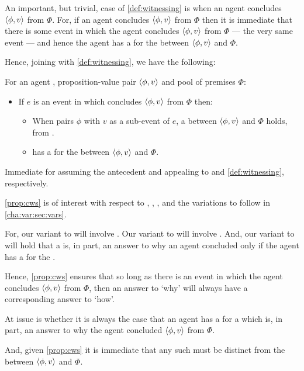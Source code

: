 \begin{note}
  An important, but trivial, case of \autoref{def:witnessing} is when an agent concludes \(\langle \phi, v \rangle\) from \(\Phi\).
  For, if an agent concludes \(\langle \phi, v \rangle\) from \(\Phi\) then it is immediate that there is some event in which the agent concludes \(\langle \phi, v \rangle\) from \(\Phi\) --- the very same event --- and hence the agent has a \wit{} for the \ros{} between \(\langle \phi, v \rangle\) and \(\Phi\).

  Hence, joining \supportI{} with \autoref{def:witnessing}, we have the following:

  \begin{proposition}
    \label{prop:cws}
    For an agent \vAgent{}, proposition-value pair \(\langle \phi, v \rangle\) and pool of premises \(\Phi\):
    \begin{itemize}
    \item
      If \(e\) is an event in which \vAgent{} concludes \(\langle \phi, v \rangle\) from \(\Phi\) then:
      \begin{itemize}
      \item
        When \vAgent{} pairs \(\phi\) with \(v\) as a sub-event of \(e\), a \ros{} between \(\langle \phi, v \rangle\) and \(\Phi\) holds, from .
      \item
        \vAgent{} has a \wit{} for the \ros{} between \(\langle \phi, v \rangle\) and \(\Phi\).
      \end{itemize}
    \end{itemize}
    \begin{argument}
      Immediate for assuming the antecedent and appealing to \supportI{} and \autoref{def:witnessing}, respectively.
    \end{argument}
  \end{proposition}

  \autoref{prop:cws} is of interest with respect to \qWhy{}, \qHow{}, \issueInclusion{}, and the variations to follow in \autoref{cha:var:sec:vars}.

  For, our variant to \qWhy{} will involve .
  Our variant to \qHow{} will involve .
  And, our variant to \issueInclusion{} will hold that a \ros{} is, in part, an answer to why an agent concluded only if the agent has a \wit{} for the \ros{}.

  Hence, \autoref{prop:cws} ensures that so long as there is an event in which the agent concludes \(\langle \phi, v \rangle\) from \(\Phi\), then an answer to `why' will always have a corresponding answer to `how'.

  At issue is whether it is always the case that an agent has a \wit{} for a \ros{} which is, in part, an answer to why the agent concluded \(\langle \phi, v \rangle\) from \(\Phi\).

  And, given \autoref{prop:cws} it is immediate that any such \ros{} must be distinct from the \ros{} between \(\langle \phi, v \rangle\) and \(\Phi\).
\end{note}

